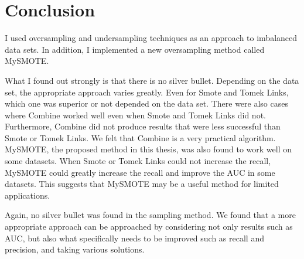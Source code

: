 \chapter{Conclusion}

I used oversampling and undersampling techniques as an approach to imbalanced data sets.
In addition, I implemented a new oversampling method called MySMOTE.

What I found out strongly is that there is no silver bullet.
Depending on the data set, the appropriate approach varies greatly.
Even for Smote and Tomek Links, which one was superior or not depended on the data set.
There were also cases where Combine worked well even when Smote and Tomek Links did not.
Furthermore, Combine did not produce results that were less successful than Smote or Tomek Links.
We felt that Combine is a very practical algorithm.
MySMOTE, the proposed method in this thesis, was also found to work well on some datasets.
When Smote or Tomek Links could not increase the recall, MySMOTE could greatly increase the recall and improve the AUC in some datasets.
This suggests that MySMOTE may be a useful method for limited applications.

Again, no silver bullet was found in the sampling method.
We found that a more appropriate approach can be approached by considering not only results such as AUC, but also what specifically needs to be improved such as recall and precision, and taking various solutions.

